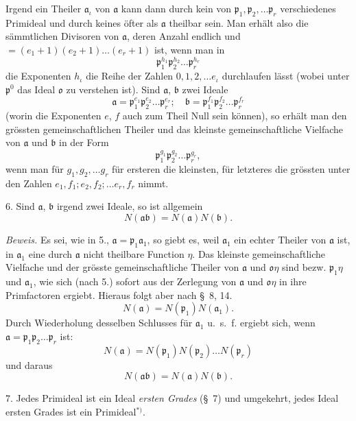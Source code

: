 \documentclass{article}
\begin{document}
Irgend ein Theiler $\mathfrak{a}_{\iota}$ von $\mathfrak{a}$ kann dann durch kein von $\mathfrak{p}_{1}, \mathfrak{p}_{2}, \ldots \mathfrak{p}_{r}$ verschiedenes Primideal und durch keines öfter als $\mathfrak{a}$ theilbar sein. Man erhält also die sämmtlichen Divisoren von $\mathfrak{a}$, deren Anzahl endlich und $= (e_{1}+1)(e_{2}+1)\ldots(e_{r}+1)$ ist, wenn man in
\[ \mathfrak{p}_{1}^{h_{1}}\mathfrak{p}_{2}^{h_{2}}\ldots\mathfrak{p}_{r}^{h_{r}} \]
die Exponenten $h_{\iota}$ die Reihe der Zahlen $0, 1, 2, \ldots e_{\iota}$ durchlaufen lässt (wobei unter $\mathfrak{p}^{0}$ das Ideal $\mathfrak{o}$ zu verstehen ist). Sind $\mathfrak{a}$, $\mathfrak{b}$ zwei Ideale
\[ \mathfrak{a} = \mathfrak{p}_{1}^{e_{1}}\mathfrak{p}_{2}^{e_{2}}\ldots\mathfrak{p}_{r}^{e_{r}}; \quad \mathfrak{b} = \mathfrak{p}_{1}^{f_{1}}\mathfrak{p}_{2}^{f_{2}}\ldots\mathfrak{p}_{r}^{f_{r}} \]
(worin die Exponenten $e$, $f$ auch zum Theil Null sein können), so erhält man den grössten gemeinschaftlichen Theiler und das kleinste gemeinschaftliche Vielfache von $\mathfrak{a}$ und $\mathfrak{b}$ in der Form
\[ \mathfrak{p}_{1}^{g_{1}}\mathfrak{p}_{2}^{g_{2}}\ldots\mathfrak{p}_{r}^{g_{r}}, \]
wenn man für $g_{1}, g_{2}, \ldots g_{r}$ für ersteren die kleinsten, für letzteres die grössten unter den Zahlen $e_{1}, f_{1}; e_{2}, f_{2}; \ldots e_{r}, f_{r}$ nimmt.

6. Sind $\mathfrak{a}$, $\mathfrak{b}$ irgend zwei Ideale, so ist allgemein
\[ N(\mathfrak{a}\mathfrak{b}) = N(\mathfrak{a})N(\mathfrak{b}). \]

\emph{Beweis.} Es sei, wie in 5., $\mathfrak{a} = \mathfrak{p}_{1}\mathfrak{a}_{1}$, so giebt es, weil $\mathfrak{a}_{1}$ ein echter Theiler von $\mathfrak{a}$ ist, in $\mathfrak{a}_{1}$ eine durch $\mathfrak{a}$ nicht theilbare Function $\eta$. Das kleinste gemeinschaftliche Vielfache und der grösste gemeinschaftliche Theiler von $\mathfrak{a}$ und $\mathfrak{o}\eta$ sind bezw. $\mathfrak{p}_{1}\eta$ und $\mathfrak{a}_{1}$, wie sich (nach 5.) sofort aus der Zerlegung von $\mathfrak{a}$ und $\mathfrak{o}\eta$ in ihre Primfactoren ergiebt. Hieraus folgt aber nach §~8, 14.
\[ N(\mathfrak{a}) = N(\mathfrak{p}_{1})N(\mathfrak{a}_{1}). \]
Durch Wiederholung desselben Schlusses für $\mathfrak{a}_{1}$ u.\ s.\ f. ergiebt sich, wenn $\mathfrak{a} = \mathfrak{p}_{1}\mathfrak{p}_{2}\ldots\mathfrak{p}_{r}$ ist:
\[ N(\mathfrak{a}) = N(\mathfrak{p}_{1})N(\mathfrak{p}_{2})\ldots N(\mathfrak{p}_{r}) \]
und daraus
\[ N(\mathfrak{a}\mathfrak{b}) = N(\mathfrak{a})N(\mathfrak{b}). \]

7. Jedes Primideal ist ein Ideal \emph{ersten Grades} (§~7) und umgekehrt, jedes Ideal ersten Grades ist ein Primideal${}^{*)}$.
\end{document}
